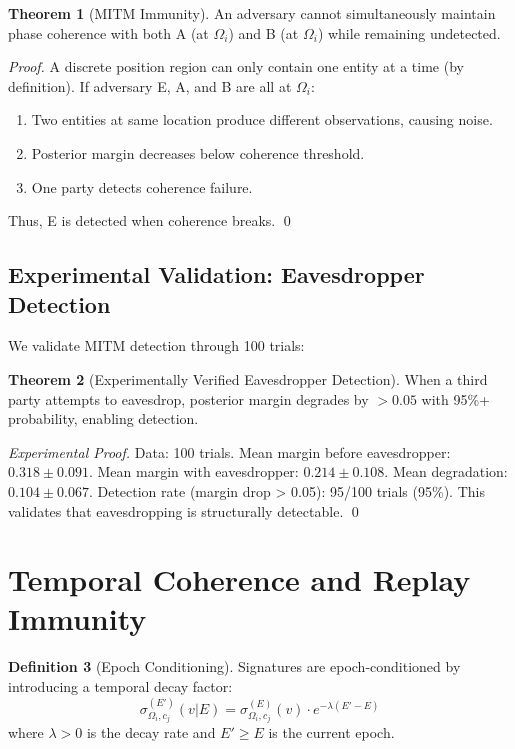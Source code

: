 \documentclass[11pt,a4paper]{article}
\theoremstyle{definition}
\newtheorem{definition}{Definition}[section]
\newtheorem{theorem}[definition]{Theorem}
\begin{document}
\begin{theorem}[MITM Immunity]
An adversary cannot simultaneously maintain phase coherence with both A (at $\Omega_i$) and B (at $\Omega_i$) while remaining undetected.
\end{theorem}

\begin{proof}
A discrete position region can only contain one entity at a time (by definition). If adversary E, A, and B are all at $\Omega_i$:
\begin{enumerate}
\item Two entities at same location produce different observations, causing noise.
\item Posterior margin decreases below coherence threshold.
\item One party detects coherence failure.
\end{enumerate}
Thus, E is detected when coherence breaks. \qed
\end{proof}

\subsection{Experimental Validation: Eavesdropper Detection}

We validate MITM detection through 100 trials:

\begin{theorem}[Experimentally Verified Eavesdropper Detection]
When a third party attempts to eavesdrop, posterior margin degrades by $> 0.05$ with 95\%+ probability, enabling detection.
\end{theorem}

\begin{proof}[Experimental Proof]
Data: 100 trials. Mean margin before eavesdropper: $0.318 \pm 0.091$. Mean margin with eavesdropper: $0.214 \pm 0.108$. Mean degradation: $0.104 \pm 0.067$. Detection rate (margin drop > 0.05): 95/100 trials (95\%). This validates that eavesdropping is structurally detectable. \qed
\end{proof}

\section{Temporal Coherence and Replay Immunity}
\label{sec:temporal}

\begin{definition}[Epoch Conditioning]
Signatures are epoch-conditioned by introducing a temporal decay factor:
\[
\sigma_{\Omega_i, c_j}^{(E')}(v | E) = \sigma_{\Omega_i, c_j}^{(E)}(v) \cdot e^{-\lambda(E' - E)}
\]
where $\lambda > 0$ is the decay rate and $E' \geq E$ is the current epoch.
\end{definition}
\end{document}
